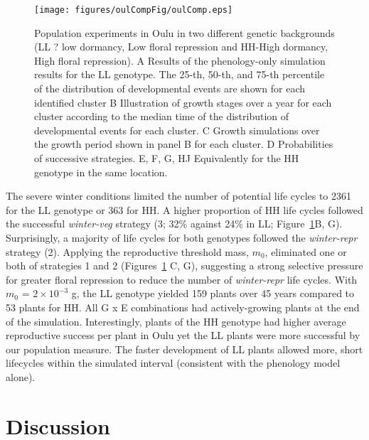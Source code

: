 \begin{figure}[p]
\centering
\texttt{[image: figures/oulCompFig/oulComp.eps]}
\caption{Population experiments in Oulu in two different genetic backgrounds (LL
  ? low dormancy, Low floral repression and HH-High dormancy, High floral
  repression). A Results of the phenology-only simulation results for the LL
  genotype. The 25-th, 50-th, and 75-th percentile of the distribution of
  developmental events are shown for each identified cluster B Illustration of
  growth stages over a year for each cluster according to the median time of the
  distribution of developmental events for each cluster. C Growth simulations
  over the growth period shown in panel B for each cluster.  D Probabilities of
  successive strategies. E, F, G, HJ Equivalently for the HH genotype in the
  same location.}
\label{fig:oulComp}
\end{figure}

The severe winter conditions limited the number of potential life cycles to 2361
for the LL genotype or 363 for HH. A higher proportion of HH life cycles
followed the successful \emph{winter-veg} strategy (3; 32\% against 24\% in LL;
Figure~\ref{fig:oulComp}B, G). Surprisingly, a majority of life cycles for both genotypes
followed the \emph{winter-repr} strategy (2).  Applying the reproductive
threshold mass, \(m_{0}\), eliminated one or both of strategies 1 and 2 (Figures~\ref{fig:oulComp}
C, G), suggesting a strong selective pressure for greater floral repression to
reduce the number of \emph{winter-repr} life cycles. With \(m_{0}\) =
\(2 \times 10^{- 3}\) g, the LL genotype yielded 159 plants over 45 years
compared to 53 plants for HH. All G x E combinations had actively-growing plants
at the end of the simulation. Interestingly, plants of the HH genotype had
higher average reproductive success per plant in Oulu yet the LL plants were
more successful by our population measure. The faster development of LL plants
allowed more, short lifecycles within the simulated interval (consistent with
the phenology model alone).

\section{Discussion}
\label{discussion}

